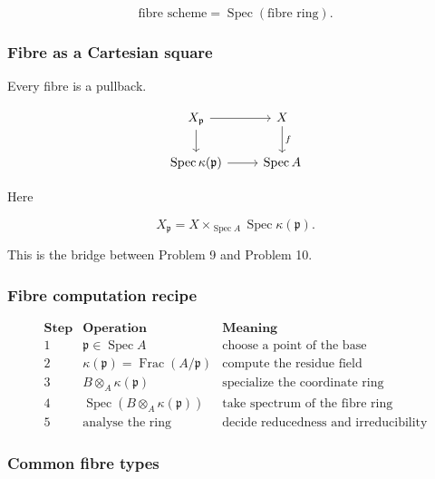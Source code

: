 \documentclass[12pt,a4paper]{article}
\theoremstyle{notespace}
\begin{document}
\[
\boxed{
	\text{fibre scheme}
	=
	\operatorname{Spec}(\text{fibre ring}).
}
\]

\subsubsection{Fibre as a Cartesian square}

Every fibre is a pullback.

\[
\begin{tikzcd}
	X_{\mathfrak{p}} \arrow[r] \arrow[d]
	&
	X \arrow[d,"f"]
	\\
	\operatorname{Spec}\kappa(\mathfrak{p}) \arrow[r]
	&
	\operatorname{Spec}A
\end{tikzcd}
\]

Here

\[
X_{\mathfrak{p}}
=
X\times_{\operatorname{Spec}A}\operatorname{Spec}\kappa(\mathfrak{p}).
\]

This is the bridge between Problem 9 and Problem 10.

\subsubsection{Fibre computation recipe}

\[
\begin{array}{c|c|c}
	\textbf{Step} & \textbf{Operation} & \textbf{Meaning} \\
	\hline
	1
	&
	\mathfrak{p}\in \operatorname{Spec}A
	&
	\text{choose a point of the base}
	\\
	\hline
	2
	&
	\kappa(\mathfrak{p})=\operatorname{Frac}(A/\mathfrak{p})
	&
	\text{compute the residue field}
	\\
	\hline
	3
	&
	B\otimes_A\kappa(\mathfrak{p})
	&
	\text{specialize the coordinate ring}
	\\
	\hline
	4
	&
	\operatorname{Spec}\left(B\otimes_A\kappa(\mathfrak{p})\right)
	&
	\text{take spectrum of the fibre ring}
	\\
	\hline
	5
	&
	\text{analyse the ring}
	&
	\text{decide reducedness and irreducibility}
\end{array}
\]

\subsubsection{Common fibre types}
\end{document}
